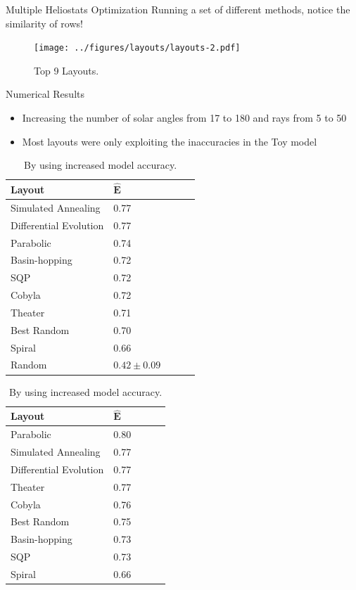 \documentclass[10pt, xcolor={dvipsnames}]{beamer}
\begin{document}
\begin{frame}{Multiple Heliostats Optimization}
Running a set of different methods, notice the similarity of rows!
\begin{center}
\begin{figure}
\texttt{[image: ../figures/layouts/layouts-2.pdf]}
\caption{Top 9 Layouts.}
\end{figure}
\end{center}
\end{frame}

\begin{frame}{Numerical Results}
\begin{itemize}
\item Increasing the number of solar angles from 17 to 180 and rays from 5 to 50
\item Most layouts were only exploiting the inaccuracies in the Toy model
\end{itemize}

\begin{table}
\parbox{.45\linewidth}{
\centering
\begin{tabular}{lllll}
             {\bf Layout} &  $\pmb{\widehat{\text{E}}}$    \\
          \hline
Simulated Annealing	    & 0.77 \\[.5em]
Differential Evolution	           & 0.77 \\[.5em]
Parabolic    & 0.74 \\[.5em]
Basin-hopping	 & 0.72 \\[.5em]
SQP	          & 0.72 \\[.5em]
Cobyla & 0.72 \\[.5em]
Theater & 0.71 \\[.5em]
Best Random	     & 0.70 \\[.5em]
Spiral       & 0.66 \\[.5em]
Random & $0.42 \pm 0.09$
\end{tabular}
\caption{By using layout optimization model accuracy.}
}
\hfill
\parbox{.45\linewidth}{
\centering
\begin{tabular}{lllll}
             {\bf Layout} &  $\pmb{\widehat{\text{E}}}$    \\
          \hline             
Parabolic    & 0.80 \\[.5em]
Simulated Annealing    & 0.77 \\[.5em]
Differential Evolution           & 0.77 \\[.5em]
Theater      & 0.77 \\[.5em]
Cobyla       & 0.76 \\[.5em]
Best Random       & 0.75 \\[.5em]
Basin-hopping & 0.73 \\[.5em]
SQP          & 0.73 \\[.5em]
Spiral       & 0.66
\end{tabular}
\caption{By using increased model accuracy.}
}
\end{table}
\end{frame}
\end{document}
